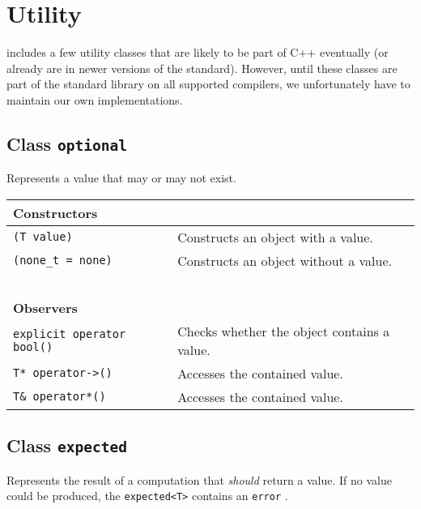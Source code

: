 \section{Utility}
\label{utility}

\lib includes a few utility classes that are likely to be part of C++ eventually (or already are in newer versions of the standard). However, until these classes are part of the standard library on all supported compilers, we unfortunately have to maintain our own implementations.

\subsection{Class \lstinline^optional^}
\label{optional}

Represents a value that may or may not exist.

\begin{center}\small
\begin{tabular}{ll}
  \textbf{Constructors} & ~ \\
  \hline
  \lstinline^(T value)^ & Constructs an object with a value. \\
  \hline
  \lstinline^(none_t = none)^ & Constructs an object without a value. \\
  \hline
  ~ & ~ \\ \textbf{Observers} & ~ \\
  \hline
  \lstinline^explicit operator bool()^ & Checks whether the object contains a value. \\
  \hline
  \lstinline^T* operator->()^ & Accesses the contained value. \\
  \hline
  \lstinline^T& operator*()^ & Accesses the contained value. \\
  \hline
\end{tabular}
\end{center}

\subsection{Class \lstinline^expected^}

Represents the result of a computation that \emph{should} return a value. If no value could be produced, the \lstinline^expected<T>^ contains an \lstinline^error^ .

